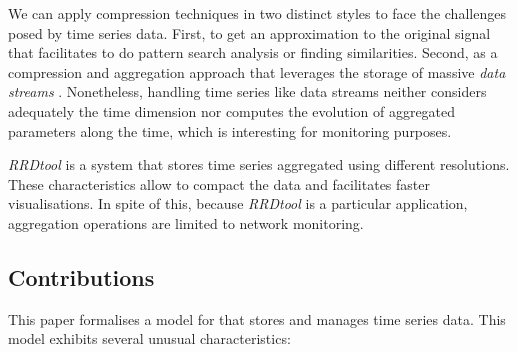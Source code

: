 We can apply compression techniques in two distinct styles to face the
challenges posed by time series data. First, to get an approximation
to the original signal that facilitates to do pattern search analysis
or finding similarities\cite{fu11,keogh01,last01}. Second, as a
compression and aggregation approach that leverages the storage of
massive \emph{data streams}
\cite{cormode08:pods,bonnet01}. Nonetheless, handling time series like
data streams neither considers adequately the time dimension nor
computes the evolution of aggregated parameters along the time, which
is interesting for monitoring purposes.

\emph{RRDtool} \cite{rrdtool} is a system that stores time series
aggregated using different resolutions. These characteristics allow
to compact the data and facilitates faster visualisations. In spite of
this, because \emph{RRDtool} is a particular application,
aggregation operations are limited to network monitoring.


\subsection{Contributions}

This paper formalises a model for  that stores and manages
time series data. This model exhibits several unusual characteristics:

